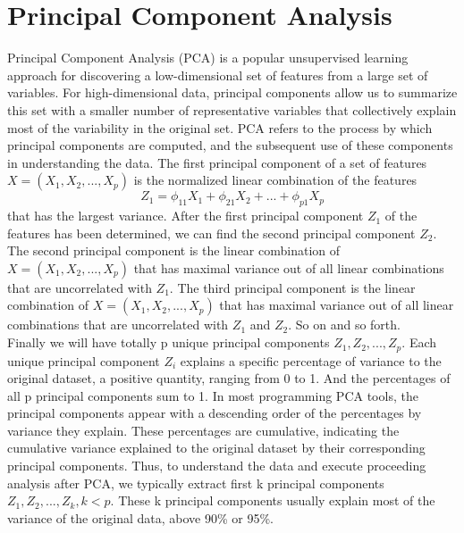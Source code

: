 \documentclass[12pt]{report} %
\begin{document}
\section{Principal Component Analysis}
Principal Component Analysis (PCA) is a popular unsupervised learning approach for discovering a low-dimensional set of features from a large set of variables. For high-dimensional data, principal components allow us to summarize this set with a smaller number of representative variables that collectively explain most of the variability in the original set. PCA refers to the process by which principal components are computed, and the subsequent use of these components in understanding the data. The first principal component of a set of features \(X = (X_{1}, X_{2},..., X_{p})\) is the normalized linear combination of the features
\begin{equation}
Z_{1} = \phi_{11}X_{1} + \phi_{21}X_{2} +...+ \phi_{p1}X_{p}
\end{equation}
that has the largest variance. After the first principal component \(Z_{1}\) of the features has been determined, we can find the second principal component \(Z_{2}\). The second principal component is the linear combination of \(X = (X_{1}, X_{2},..., X_{p})\) that has maximal variance out of all linear combinations that are uncorrelated with \(Z_{1}\). The third principal component is the linear combination of \(X = (X_{1}, X_{2},..., X_{p})\) that has maximal variance out of all linear combinations that are uncorrelated with \(Z_{1}\) and \(Z_{2}\). So on and so forth\cite{STAT}. \\
Finally we will have totally p unique principal components \(Z_{1}, Z_{2},...,Z_{p}\). Each unique principal component \(Z_{i}\) explains a specific percentage of variance to the original dataset, a positive quantity, ranging from 0 to 1. And the percentages of all p principal components sum to 1. In most programming PCA tools, the principal components appear with a descending order of the percentages by variance they explain. These percentages are cumulative, indicating the cumulative variance explained to the original dataset by their corresponding principal components. Thus, to understand the data and execute proceeding analysis after PCA, we typically extract first k principal components \(Z_{1}, Z_{2},...,Z_{k}, k <p \). These k principal components usually explain most of the variance of the original data, above 90\% or 95\%.
\end{document}
